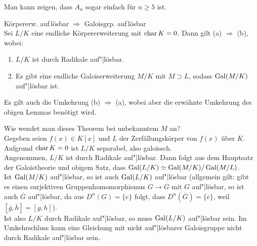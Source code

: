 \begin{Bem}
    Man kann zeigen, dass $A_n$ sogar einfach für $n \ge 5$ ist.
\end{Bem}

\linie
\pagebreak

\begin{Theorem}{Körpererw. auf\,\!lösbar $\Rightarrow$
                Galoisgrp. auf\,\!lösbar}\\
    Sei $L/K$ eine endliche Körpererweiterung mit $\operatorname{char} K = 0$.
    Dann gilt (a) $\Rightarrow$ (b), wobei:
    \begin{enumerate}[label=(\alph*)]
        \item
        $L/K$ ist durch Radikale auf"|lösbar.
        
        \item
        Es gibt eine endliche Galoiserweiterung $M/K$ mit $M \supset L$,
        sodass $\operatorname{Gal}(M/K)$ auf"|lösbar ist.
    \end{enumerate}
\end{Theorem}

\begin{Bem}
    Es gilt auch die Umkehrung (b) $\Rightarrow$ (a), wobei aber die
    erwähnte Umkehrung des obigen Lemmas benötigt wird.
\end{Bem}

\begin{Bem}
    Wie wendet man dieses Theorem bei unbekanntem $M$ an?\\
    Gegeben seien $f(x) \in K[x]$ und
    $L$ der Zerfällungskörper von $f(x)$ über $K$.
    Aufgrund $\operatorname{char} K = 0$ ist $L/K$ separabel, also galoissch.\\
    Angenommen, $L/K$ ist durch Radikale auf"|lösbar.
    Dann folgt aus dem Hauptsatz der Galoistheorie und obigem Satz, dass
    $\operatorname{Gal}(L/K) \simeq \operatorname{Gal}(M/K)/\operatorname{Gal}(M/L)$.\\
    Ist $\operatorname{Gal}(M/K)$ auf"|lösbar, so ist auch $\operatorname{Gal}(L/K)$ auf"|lösbar
    (allgemein gilt:
    gibt es einen surjektiven Gruppenhomomorphismus
    $G \rightarrow \overline{G}$ mit $G$ auf"|lösbar, so ist auch
    $\overline{G}$ auf"|lösbar,
    da aus $D^n(G) = \{e\}$ folgt, dass
    $D^n(\overline{G}) = \{\overline{e}\}$, weil
    $[\overline{g}, \overline{h}] = \overline{[g, h]}$).\\
    Ist also $L/K$ durch Radikale auf"|lösbar, so muss
    $\operatorname{Gal}(L/K)$ auf"|lösbar sein.
    Im Umkehrschluss kann eine Gleichung mit nicht auf"|lösbarer Galoisgruppe
    nicht durch Radikale auf"|lösbar sein.
\end{Bem}


